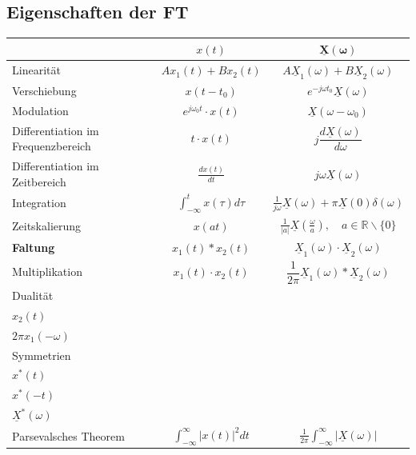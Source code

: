 \begin{multicols*}{2}
\subsection{Eigenschaften der FT}
{	\renewcommand{\arraystretch}{1.9}
\begin{tabularx}{1.03\columnwidth}{|X|c|c|}
	\hline & $x(t)$ & $\mathbf{\underline{X}(\omega)}$ \\
	\hline Linearität & $A x_{1}(t)+B x_{2}(t)$ & $A \underline{X}_{1}(\omega)+B \underline{X}_{2}(\omega)$ \\
	\hline  Verschiebung & $x(t-t_0)$ & $e^{-j \omega t_0} \underline{X}(\omega)$ \\
	\hline Modulation & $e^{j \omega_{0} t} \cdot x(t)$ & $\underline{X}\left(\omega-\omega_{0}\right)$ \\
	\hline 
		\small Differentiation im Frequenzbereich
	 & $t \cdot x(t)$ & $j \dfrac{d \underline{X}(\omega)}{d \omega}$ \\
	\hline 
		\small Differentiation
		im Zeitbereich & $\frac{d x(t)}{d t}$ & $j \omega \underline{X}(\omega)$ \\
	\hline Integration & $\int_{-\infty}^{t} x(\tau) d \tau$ & $\frac{1}{j \omega} \underline{X}(\omega)+\pi \underline{X}(0) \delta(\omega)$ \\
	\hline Zeitskalierung & $x(a t)$ & $\frac{1}{|a|} \underline{X}\left(\frac{\omega}{a}\right), \quad a \in \mathbb{R} \backslash\{0\}$ \\
	\hline \textbf{Faltung} & $x_{1}(t) * x_{2}(t)$ & $\underline{X}_{1}(\omega) \cdot \underline{X}_{2}(\omega)$ \\
	\hline Multiplikation & $x_{1}(t) \cdot x_{2}(t)$ & $\dfrac{1}{2 \pi} \underline{X}_{1}(\omega) * \underline{X}_{2}(\omega)$ \\
	\hline Dualität & \begin{tabular}{l}
		$x_{1}(t)$ \\
		$x_{2}(t)$
	\end{tabular} & \begin{tabular}{l}
		$x_{2}(\omega)$ \\
		$2 \pi x_{1}(-\omega)$
	\end{tabular} \\
	\hline Symmetrien & \begin{tabular}{c}
		$x(-t)$ \\
		$x^{*}(t)$ \\
		$x^{*}(-t)$
	\end{tabular} & \begin{tabular}{c}
		$\dfrac{X}{X^{*}}(-\omega)$ \\
		$\underline{X}^{*}(\omega)$
	\end{tabular} \\
	\hline Parsevalsches Theorem & $\int_{-\infty}^{\infty}|x(t)|^{2} d t$ & $\frac{1}{2 \pi} \int_{-\infty}^{\infty} \left|\underline{X}(\omega) \right| $\\
	\hline	
\end{tabularx} }


\end{multicols*}
